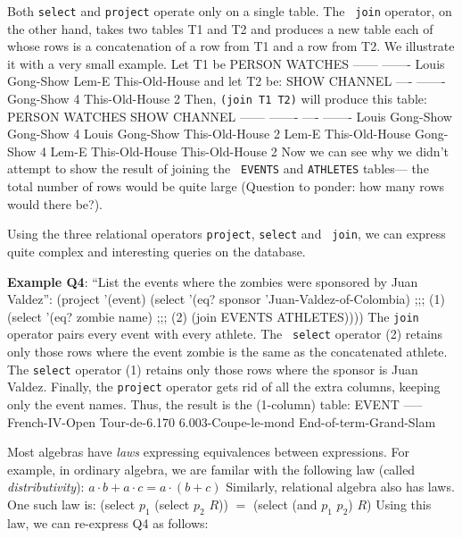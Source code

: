 Both {\tt select} and {\tt project} operate only on a single table.  The {\tt
join} operator, on the other hand, takes two tables T1 and T2 and produces a
new table each of whose rows is a concatenation of a row from T1 and a row
from T2.  We illustrate it with a very small example.  Let T1 be
 \beginlisp
PERSON  WATCHES
------  -------
Louis   Gong-Show
Lem-E   This-Old-House
 \endlisp
and let T2 be:
 \beginlisp
SHOW            CHANNEL
----            -------
Gong-Show       4
This-Old-House  2
 \endlisp
 Then, {\tt (join T1 T2)} will produce this table:
 \beginlisp
PERSON  WATCHES            SHOW            CHANNEL
------  -------            ----            -------
Louis   Gong-Show          Gong-Show       4
Louis   Gong-Show          This-Old-House  2
Lem-E   This-Old-House     Gong-Show       4
Lem-E   This-Old-House     This-Old-House  2
 \endlisp
 Now we can see why we didn't attempt to show the result of joining the {\tt
EVENTS} and {\tt ATHLETES} tables--- the total number of rows would be quite
large (Question to ponder: how many rows would there be?).

Using the three relational operators {\tt project}, {\tt select} and {\tt
join}, we can express quite complex and interesting queries on the database.

{\bf Example Q4}: ``List the events where the zombies were sponsored by
Juan Valdez'':
 \beginlisp
(project '(event)
         (select '(eq? sponsor 'Juan-Valdez-of-Colombia)   ;;; (1)
                 (select '(eq? zombie name)                ;;; (2)
                         (join EVENTS ATHLETES))))
 \endlisp
 The {\tt join} operator pairs every event with every athlete.  The {\tt
select} operator (2) retains only those rows where the event zombie is the
same as the concatenated athlete.  The {\tt select} operator (1) retains only
those rows where the sponsor is Juan Valdez.  Finally, the {\tt project}
operator gets rid of all the extra columns, keeping only the event names.
Thus, the result is the (1-column) table:
 \beginlisp
EVENT
-----
French-IV-Open
Tour-de-6.170
6.003-Coupe-le-mond
End-of-term-Grand-Slam
 \endlisp

Most algebras have {\em laws\/} expressing equivalences between expressions.
For example, in ordinary algebra, we are familar with the following law
(called {\em distributivity\/}): 
 \beginlisp
$a \cdot b + a \cdot c = a \cdot (b + c)$
 \endlisp
Similarly, relational algebra also has laws.  One such law is:
 \beginlisp
(select $p_1$ (select $p_2$ $R$))  $=$  (select (and $p_1$ $p_2$) $R$)
 \endlisp
 Using this law, we can re-express Q4 as follows:

